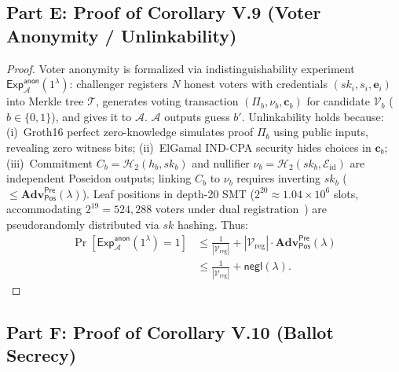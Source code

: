 \documentclass[10pt,letterpaper,journal]{IEEEtran}
\begin{document}
\subsection{Part E: Proof of Corollary V.9 (Voter Anonymity / Unlinkability)}
\label{sec:supp-proof-anonymity}

\begin{proof}
Voter anonymity is formalized via indistinguishability experiment $\mathsf{Exp}_{\mathcal{A}}^{\mathsf{anon}}(1^\lambda)$:
challenger registers $N$ honest voters with credentials $(sk_i, s_i, \mathbf{e}_i)$ into Merkle tree $\mathcal{T}$, generates voting transaction $(\Pi_b, \nu_b, \mathbf{c}_b)$ for candidate $\mathcal{V}_b$ ($b \in \{0,1\}$), and gives it to $\mathcal{A}$. $\mathcal{A}$ outputs guess $b'$. Unlinkability holds because:
(i)~Groth16 perfect zero-knowledge simulates proof $\Pi_b$ using public inputs, revealing zero witness bits;
(ii)~ElGamal IND-CPA security hides choices in $\mathbf{c}_b$;
(iii)~Commitment $C_b = \mathcal{H}_2(h_b, sk_b)$ and nullifier $\nu_b = \mathcal{H}_2(sk_b, \mathcal{E}_{\mathrm{id}})$ are independent Poseidon outputs; linking $C_b$ to $\nu_b$ requires inverting $sk_b$ ($\le \mathbf{Adv}_{\mathsf{Pos}}^{\mathsf{Pre}}(\lambda)$).
Leaf positions in depth-20 SMT ($2^{20} \approx 1.04 \times 10^6$ slots, accommodating $2^{19} = 524{,}288$ voters under dual registration~\cite{Gurkan2020}) are pseudorandomly distributed via $sk$ hashing. Thus:
\begin{equation}
\label{eq:supp-anonymity-bound}
\begin{aligned}
  \Pr\left[\mathsf{Exp}_{\mathcal{A}}^{\mathsf{anon}}(1^\lambda) = 1\right]
  &\leq \frac{1}{|\mathcal{V}_{\mathrm{reg}}|} + |\mathcal{V}_{\mathrm{reg}}| \cdot \mathbf{Adv}_{\mathsf{Pos}}^{\mathsf{Pre}}(\lambda) \\
  &\leq \frac{1}{|\mathcal{V}_{\mathrm{reg}}|} + \mathsf{negl}(\lambda).
\end{aligned}
\end{equation}
\end{proof}

\subsection{Part F: Proof of Corollary V.10 (Ballot Secrecy)}
\label{sec:supp-proof-secrecy}
\end{document}
